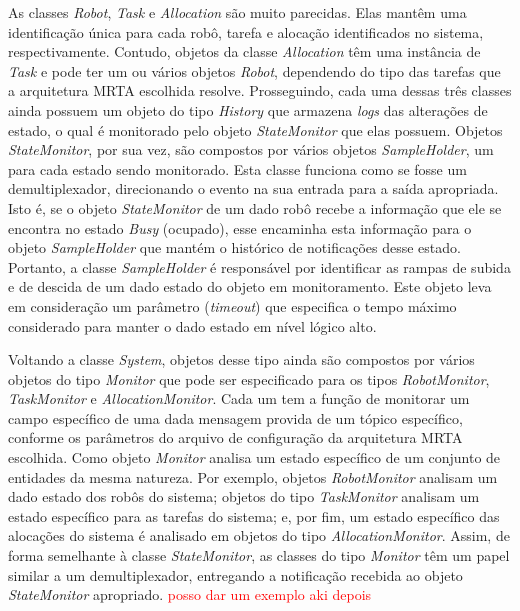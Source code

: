             As classes \textit{Robot}, \textit{Task} e \textit{Allocation} são muito parecidas. Elas mantêm uma identificação única para cada robô, tarefa e alocação identificados no sistema, respectivamente. Contudo, objetos da classe \textit{Allocation} têm uma instância de \textit{Task} e pode ter um ou vários objetos \textit{Robot}, dependendo do tipo das tarefas que a arquitetura MRTA escolhida resolve. Prosseguindo, cada uma dessas três classes ainda possuem um objeto do tipo \textit{History} que armazena \textit{logs} das alterações de estado, o qual é monitorado pelo objeto \textit{StateMonitor} que elas possuem. Objetos \textit{StateMonitor}, por sua vez, são compostos por vários objetos \textit{SampleHolder}, um para cada estado sendo monitorado. Esta classe funciona como se fosse um demultiplexador, direcionando o evento na sua entrada para a saída apropriada. Isto é, se o objeto \textit{StateMonitor} de um dado robô recebe a informação que ele se encontra no estado \textit{Busy} (ocupado), esse encaminha esta informação para o objeto \textit{SampleHolder} que mantém o histórico de notificações desse estado. Portanto, a classe \textit{SampleHolder} é responsável por identificar as rampas de subida e de descida de um dado estado do objeto em monitoramento. Este objeto leva em consideração um parâmetro (\textit{timeout}) que especifica o tempo máximo considerado para manter o dado estado em nível lógico alto.
            
            Voltando a classe \textit{System}, objetos desse tipo ainda são compostos por vários objetos do tipo \textit{Monitor} que pode ser especificado para os tipos \textit{RobotMonitor}, \textit{TaskMonitor} e \textit{AllocationMonitor}. Cada um tem a função de monitorar um campo específico de uma dada mensagem provida de um tópico específico, conforme os parâmetros do arquivo de configuração da arquitetura MRTA escolhida.  Como objeto \textit{Monitor} analisa um estado específico de um conjunto de entidades da mesma natureza. Por exemplo, objetos \textit{RobotMonitor} analisam um dado estado dos robôs do sistema; objetos do tipo \textit{TaskMonitor} analisam um estado específico para as tarefas do sistema; e, por fim, um estado específico das alocações do sistema é analisado em objetos do tipo \textit{AllocationMonitor}. Assim, de forma semelhante à classe \textit{StateMonitor}, as classes do tipo \textit{Monitor} têm um papel similar a um demultiplexador, entregando a notificação recebida ao objeto \textit{StateMonitor} apropriado. \textcolor{red}{posso dar um exemplo aki depois}
            
